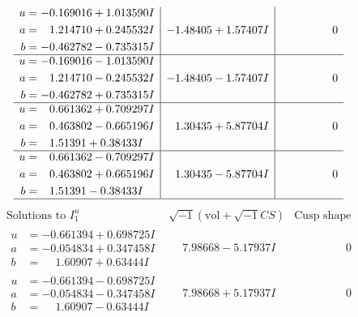 \documentclass[1p]{elsarticle_modified}
\theoremstyle{definition}
\newcommand{\I}{\sqrt{-1}}
\begin{document}
$$\begin{array}{c|c|c}
\begin{aligned}
u &= -0.169016 + 1.013590 I \\
a &= \phantom{-}1.214710 + 0.245532 I \\
b &= -0.462782 - 0.735315 I\end{aligned}
 & -1.48405 + 1.57407 I & \phantom{-0.000000 } 0 \\ \hline\begin{aligned}
u &= -0.169016 - 1.013590 I \\
a &= \phantom{-}1.214710 - 0.245532 I \\
b &= -0.462782 + 0.735315 I\end{aligned}
 & -1.48405 - 1.57407 I & \phantom{-0.000000 } 0 \\ \hline\begin{aligned}
u &= \phantom{-}0.661362 + 0.709297 I \\
a &= \phantom{-}0.463802 - 0.665196 I \\
b &= \phantom{-}1.51391 + 0.38433 I\end{aligned}
 & \phantom{-}1.30435 + 5.87704 I & \phantom{-0.000000 } 0 \\ \hline\begin{aligned}
u &= \phantom{-}0.661362 - 0.709297 I \\
a &= \phantom{-}0.463802 + 0.665196 I \\
b &= \phantom{-}1.51391 - 0.38433 I\end{aligned}
 & \phantom{-}1.30435 - 5.87704 I & \phantom{-0.000000 } 0\\
 \hline 
 \end{array}$$\newpage$$\begin{array}{c|c|c}  
\text{Solutions to }I^u_{1}& \I (\text{vol} + \sqrt{-1}CS) & \text{Cusp shape}\\
 \hline 
\begin{aligned}
u &= -0.661394 + 0.698725 I \\
a &= -0.054834 + 0.347458 I \\
b &= \phantom{-}1.60907 + 0.63444 I\end{aligned}
 & \phantom{-}7.98668 - 5.17937 I & \phantom{-0.000000 } 0 \\ \hline\begin{aligned}
u &= -0.661394 - 0.698725 I \\
a &= -0.054834 - 0.347458 I \\
b &= \phantom{-}1.60907 - 0.63444 I\end{aligned}
 & \phantom{-}7.98668 + 5.17937 I & \phantom{-0.000000 } 0 \\ \hline\begin{aligned}

\end{aligned}
\end{array}$$
\end{document}
